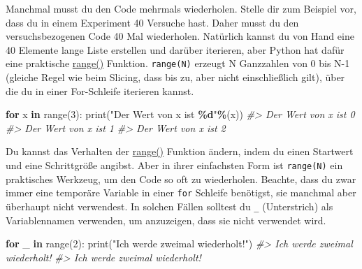 \documentclass[
]{book}
\newenvironment{Shaded}{\begin{snugshade}}{\end{snugshade}}
\newcommand{\BuiltInTok}[1]{#1}
\newcommand{\CommentTok}[1]{\textcolor[rgb]{0.56,0.35,0.01}{\textit{#1}}}
\newcommand{\ControlFlowTok}[1]{\textcolor[rgb]{0.13,0.29,0.53}{\textbf{#1}}}
\newcommand{\DecValTok}[1]{\textcolor[rgb]{0.00,0.00,0.81}{#1}}
\newcommand{\KeywordTok}[1]{\textcolor[rgb]{0.13,0.29,0.53}{\textbf{#1}}}
\newcommand{\NormalTok}[1]{#1}
\newcommand{\OperatorTok}[1]{\textcolor[rgb]{0.81,0.36,0.00}{\textbf{#1}}}
\newcommand{\SpecialCharTok}[1]{\textcolor[rgb]{0.81,0.36,0.00}{\textbf{#1}}}
\newcommand{\StringTok}[1]{\textcolor[rgb]{0.31,0.60,0.02}{#1}}
\begin{document}
Manchmal musst du den Code mehrmals wiederholen. Stelle dir zum Beispiel vor, dass du in einem Experiment 40 Versuche hast. Daher musst du den versuchsbezogenen Code 40 Mal wiederholen. Natürlich kannst du von Hand eine 40 Elemente lange Liste erstellen und darüber iterieren, aber Python hat dafür eine praktische \href{https://docs.python.org/3/tutorial/controlflow.html?highlight=loop\#the-range-function}{range()} Funktion. \texttt{range(N)} erzeugt N Ganzzahlen von 0 bis N-1 (gleiche Regel wie beim Slicing, dass bis zu, aber nicht einschließlich gilt), über die du in einer For-Schleife iterieren kannst.

\begin{Shaded}
\begin{Highlighting}[]
\ControlFlowTok{for}\NormalTok{ x }\KeywordTok{in} \BuiltInTok{range}\NormalTok{(}\DecValTok{3}\NormalTok{):}
    \BuiltInTok{print}\NormalTok{(}\StringTok{"Der Wert von x ist }\SpecialCharTok{\%d}\StringTok{"}\OperatorTok{\%}\NormalTok{(x))}
\CommentTok{\#\textgreater{} Der Wert von x ist 0}
\CommentTok{\#\textgreater{} Der Wert von x ist 1}
\CommentTok{\#\textgreater{} Der Wert von x ist 2}
\end{Highlighting}
\end{Shaded}

Du kannst das Verhalten der \href{https://docs.python.org/3/library/stdtypes.html\#range}{range()} Funktion ändern, indem du einen Startwert und eine Schrittgröße angibst. Aber in ihrer einfachsten Form ist \texttt{range(N)} ein praktisches Werkzeug, um den Code so oft zu wiederholen. Beachte, dass du zwar immer eine temporäre Variable in einer \texttt{for} Schleife benötigst, sie manchmal aber überhaupt nicht verwendest. In solchen Fällen solltest du \texttt{\_} (Unterstrich) als Variablennamen verwenden, um anzuzeigen, dass sie nicht verwendet wird.

\begin{Shaded}
\begin{Highlighting}[]
\ControlFlowTok{for}\NormalTok{ \_ }\KeywordTok{in} \BuiltInTok{range}\NormalTok{(}\DecValTok{2}\NormalTok{):}
    \BuiltInTok{print}\NormalTok{(}\StringTok{"Ich werde zweimal wiederholt!"}\NormalTok{)}
\CommentTok{\#\textgreater{} Ich werde zweimal wiederholt!}
\CommentTok{\#\textgreater{} Ich werde zweimal wiederholt!}
\end{Highlighting}
\end{Shaded}
\end{document}
